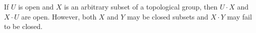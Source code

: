 If $U$ is open and $X$ is an arbitrary subset of a topological group, then $U \cdot X$ and $X \cdot U$ are open. However, both $X$ and $Y$ may be closed subsets and $X \cdot Y$ may fail to be closed.
